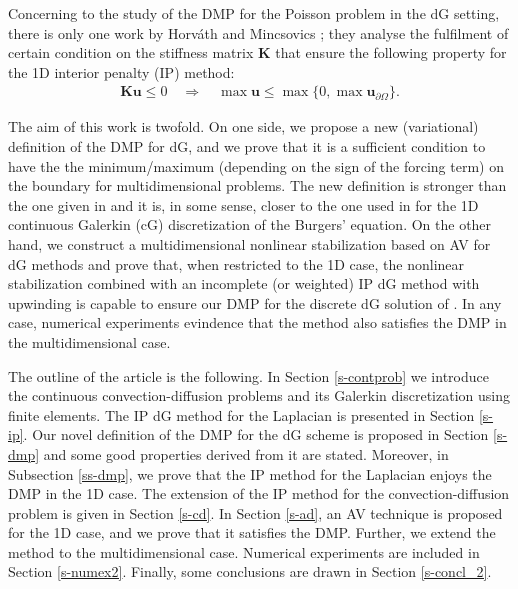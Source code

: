 Concerning to the study of the DMP for the Poisson problem in the dG setting, there is {only} one work by Horv\'ath and Mincsovics \cite{horvath_discrete_2013}; they analyse the fulfilment of certain condition on the stiffness matrix $\mathbf{K}$ that ensure the following property for the 1D interior penalty (IP) method:
\begin{align*}
\mathbf{Ku}\leq 0 \quad \Longrightarrow   \quad \max \mathbf{u} \leq \max\{0,\max \mathbf{u}_{\partial \Omega}\}. 
\end{align*} 

{The aim of this work is twofold. On one side, we propose a new (variational) definition of the DMP for dG, {and we prove that it is a sufficient condition to have the the minimum/maximum (depending on the sign of the forcing term) on the boundary for multidimensional problems}. The new definition is stronger than the one given in \cite{horvath_discrete_2013} and it is, in some sense, closer to the one used in \cite{burman_nonlinear_2007} for the 1D continuous Galerkin (cG) discretization of the Burgers' equation. On the other hand, we construct a multidimensional nonlinear stabilization based on AV for dG methods and prove that, when restricted to the 1D case, the nonlinear stabilization combined with an incomplete (or weighted) IP dG method with upwinding is capable to ensure our DMP for the discrete dG solution of . In any case, numerical experiments evindence that the method also satisfies the DMP in the multidimensional case.}


The outline of the article is the following. In Section \ref{s-contprob} we introduce the continuous convection-diffusion problems and its Galerkin discretization using finite elements. The IP dG method for the Laplacian is presented in Section \ref{s-ip}. Our novel definition of the DMP for the dG scheme is proposed in Section \ref{s-dmp} and some good properties derived from it are stated. Moreover, in Subsection \ref{ss-dmp}, we prove that the IP method for the Laplacian enjoys the DMP in the 1D case. The extension of the IP method for the convection-diffusion problem  is given in Section \ref{s-cd}. In Section \ref{s-ad}, an AV technique is proposed for the 1D case, and we prove that it satisfies the DMP. Further, we extend the method to the multidimensional case. Numerical experiments are included in Section \ref{s-numex2}. Finally, some conclusions are drawn in Section \ref{s-concl_2}.


